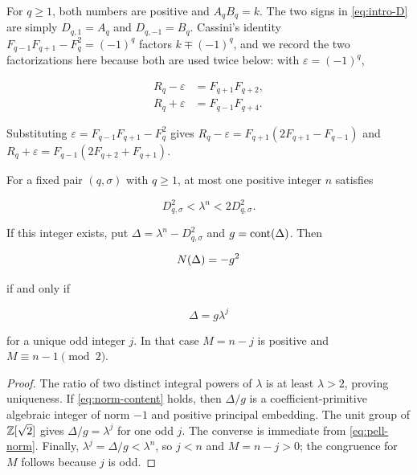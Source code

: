 For $q\geqslant1$, both numbers are positive and $A_qB_q=k$. The two signs
in \cref{eq:intro-D} are simply $D_{q,1}=A_q$ and
$D_{q,-1}=B_q$. Cassini's identity
$F_{q-1}F_{q+1}-F_q^2=(-1)^q$ factors $k\mp(-1)^q$, and we record the two
factorizations here because both are used twice below: with
$\varepsilon=(-1)^q$,

\begin{equation}
\begin{aligned}
 R_q-\varepsilon&=F_{q+1}F_{q+2},\\
 R_q+\varepsilon&=F_{q-1}F_{q+4}.
\end{aligned}
\label{eq:cassini-factors}
\end{equation}

Substituting $\varepsilon=F_{q-1}F_{q+1}-F_q^2$ gives
$R_q-\varepsilon=F_{q+1}(2F_{q+1}-F_{q-1})$ and
$R_q+\varepsilon=F_{q-1}(2F_{q+2}+F_{q+1})$.

\begin{lemma}
\label{lem:normalization}
For a fixed pair $(q,\sigma)$ with $q\geqslant1$, at most one positive
integer $n$ satisfies

\begin{equation}
 D_{q,\sigma}^2<\lambda^n<2D_{q,\sigma}^2.
 \label{eq:nearest-window}
\end{equation}

If this integer exists, put $\Delta=\lambda^n-D_{q,\sigma}^2$ and
$g=\operatorname{cont}\!\left(\Delta\right)$. Then

\begin{equation}
 N\!\left(\Delta\right)=-g^2
 \label{eq:norm-content}
\end{equation}

if and only if

\begin{equation}
 \Delta=g\lambda^j
 \label{eq:normalized-unit}
\end{equation}

for a unique odd integer $j$. In that case $M=n-j$ is positive and
$M\equiv n-1\pmod2$.
\end{lemma}

\begin{proof}
The ratio of two distinct integral powers of $\lambda$ is at least
$\lambda>2$, proving uniqueness. If \cref{eq:norm-content} holds, then
$\Delta/g$ is a coefficient-primitive algebraic integer of norm $-1$ and
positive principal embedding. The unit group of $\mathbb{Z}[\sqrt2]$ gives
$\Delta/g=\lambda^j$ for one odd $j$. The converse is immediate from
\cref{eq:pell-norm}. Finally,
$\lambda^j=\Delta/g<\lambda^n$, so $j<n$ and $M=n-j>0$; the congruence for
$M$ follows because $j$ is odd.
\end{proof}

